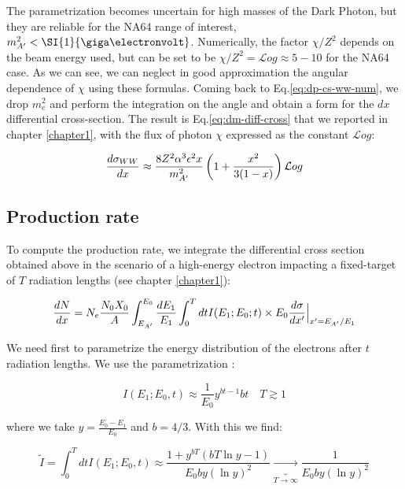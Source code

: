  The parametrization becomes uncertain for high masses of the Dark Photon, but they are reliable for the NA64 range of interest, $m^2_{\DM} < \SI{1}{\giga\electronvolt}$. Numerically, the factor $\chi / Z^2$ depends on the beam energy used, but can be set to be $\chi/Z^2 = \mathcal{L}og \approx 5-10$ for the NA64 case. As we can see, we can neglect in good approximation the angular dependence of $\chi$ using these formulas. Coming back to Eq.\ref{eq:dp-cs-ww-num}, we drop $m^2_e$ and perform the integration on the angle and obtain a form for the $dx$ differential cross-section. The result is Eq.\ref{eq:dm-diff-cross} that we reported in chapter \ref{chapter1}, with the flux of photon $\chi$ expressed as the constant $\mathcal{L}og$:

 \begin{equation}
   \label{eq:dp-cs-dx}
\frac{d\sigma_{WW}}{dx} \approx \frac{8 Z^2 \alpha^3 \epsilon^2 x}{m^2_{A'}} \left( 1 + \frac{x^2}{3(1-x)} \right) \mathcal{L}og    
\end{equation}


\subsection{Production rate}
\label{appA:sec:production-rate}

To compute the production rate, we integrate the differential cross section obtained above in the scenario of a high-energy electron impacting a fixed-target of $T$ radiation lengths (see chapter \ref{chapter1}):


\begin{equation}
  \label{eq:dm-gy}
  \frac{dN}{dx} = N_e \frac{N_0 X_0}{A} \int_{E_{A'}}^{E_0} \frac{dE_1}{E_1} \int_0^T dt I(E_1;E_0;t) \times E_0 \frac{d\sigma}{dx'}\Big|_{x' = E_{A'}/E_1}
\end{equation}

We need first to parametrize the energy distribution of the electrons after $t$ radiation lengths. We use the parametrization \cite{jdb}:

\begin{equation}
  \label{eq:i-dist}
  I(E_1;E_0,t) \approx  \frac{1}{E_0} y^{bt-1} bt \quad T \gtrsim 1
\end{equation}

where we take $y = \frac{E_0 - E_1}{E_0}$ and $b=4/3$. With this we find:

\begin{equation}
  \label{eq:i-int}
  \widetilde{I} = \int^T_0 dt I(E_1; E_0, t) \approx \frac{1 + y^{bT}(bT\ln{y} - 1)}{E_0by(\ln{y})^2} \underbrace{\to}_{T \to \infty} \frac{1}{E_0by(\ln{y})^2}
\end{equation}

